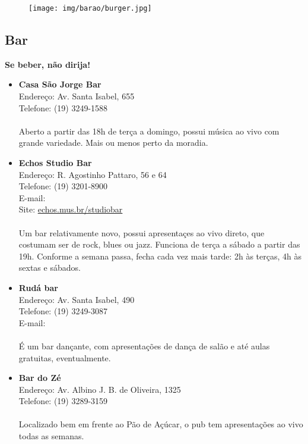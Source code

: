 \begin{figure}[h!]
  \centering
  \texttt{[image: img/barao/burger.jpg]}
\end{figure}

\subsection{Bar}

\textbf{Se beber, não dirija!}

\begin{itemize}
\item \textbf{Casa São Jorge Bar}
  \\Endereço: Av. Santa Isabel, 655
  \\Telefone: (19) 3249-1588
  \\
  \\Aberto a partir das 18h de terça a domingo, possui música ao vivo com
  grande variedade. Mais ou menos perto da moradia.

\item \textbf{Echos Studio Bar}
  \\Endereço: R. Agostinho Pattaro, 56 e 64
  \\Telefone: (19) 3201-8900
  \\E-mail: 
  \\Site: \url{echos.mus.br/studiobar}
  \\
  \\Um bar relativamente novo, possui apresentaçes ao vivo direto, que costumam
  ser de rock, blues ou jazz. Funciona de terça a sábado a partir das 19h.
  Conforme a semana passa, fecha cada vez mais tarde: 2h às terças, 4h às
  sextas e sábados.

\item \textbf{Rudá bar}
  \\Endereço: Av. Santa Isabel, 490
  \\Telefone: (19) 3249-3087
  \\E-mail: 
  \\
  \\É um bar dançante, com apresentações de dança de salão e até aulas
  gratuitas, eventualmente.

\item \textbf{Bar do Zé}
  \\Endereço: Av. Albino J. B. de Oliveira, 1325
  \\Telefone: (19) 3289-3159
  \\
  \\Localizado bem em frente ao Pão de Açúcar, o pub tem apresentações ao vivo
  todas as semanas.


\end{itemize}
